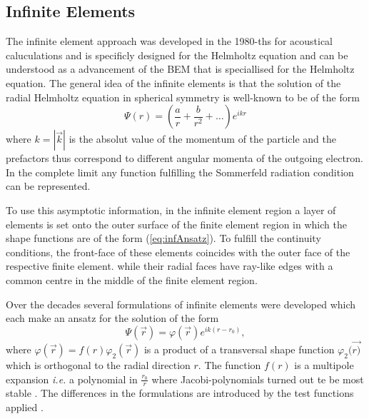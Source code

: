 \subsection{Infinite Elements}
The infinite element approach was developed in the 1980-ths for acoustical caluculations and is specificly designed for the Helmholtz equation and can be understood as a advancement of the BEM that is speciallised for the Helmholtz equation.
The general idea of the infinite elements is that the solution of the radial Helmholtz equation in spherical symmetry is well-known to be of the form
\begin{equation} \label{eq:infAnsatz}
 \Psi(r) = \left(\frac ar +\frac{b}{r^2} + \hdots \right) e^{ikr}
\end{equation}
where $k=|\vec{k}|$ is the absolut value of the momentum of the particle and the prefactors thus correspond to different angular momenta of the outgoing electron.
In the complete limit any function fulfilling the Sommerfeld radiation condition \cite{sommerfeldCond} can be represented.

To use this asymptotic information, in the infinite element region a layer of elements is set onto the outer surface of the finite element region in which the shape functions are of the form (\ref{eq:infAnsatz}).
To fulfill the continuity conditions, the front-face of these elements coincides with the outer face of the respective finite element. while their radial faces have ray-like edges with a common centre in the middle of the finite element region.

Over the decades several formulations of infinite elements were developed which each make an ansatz for the solution of the form
\begin{equation} \label{eq:Infansatz}
 \Psi(\vec{r}) = \varphi(\vec{r}) e^{ik(r-r_0)},
\end{equation}
where $\varphi(\vec{r})=f(r)\varphi_2(\vec{r})$ is a product of a transversal shape function $\varphi_2(\vec{r)}$ which is orthogonal to the radial direction $r$.
The function $f(r)$ is a multipole expansion \textit{i.e.} a polynomial in $\frac{r_0}{r}$ where Jacobi-polynomials turned out te be most stable \cite{dreyer_improved}.
The differences in the formulations are introduced by the test functions applied \cite{Astley}.

